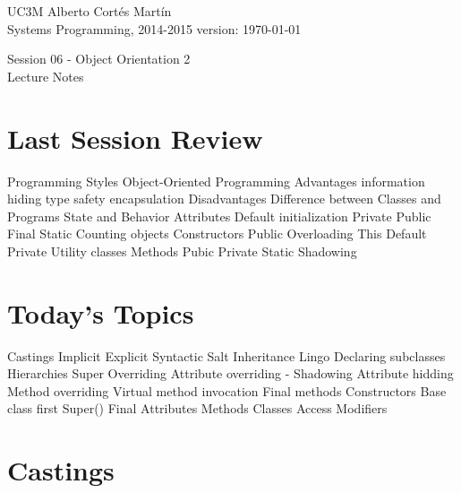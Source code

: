 \documentclass[a4paper, 9pt]{extarticle}
\newcommand{\realtitle}{Session 06 - Object Orientation 2}
\begin{document}
\makebox[\linewidth]{\rule{\textwidth}{0.4pt}}
UC3M \hfill Alberto Cortés Martín\\
Systems Programming, 2014-2015 \hfill version: \today\\
\makebox[\linewidth]{\rule{\textwidth}{0.4pt}}
\begin{center}
  \Large{\realtitle}\\Lecture Notes
\end{center}
\makebox[\linewidth]{\rule{\textwidth}{0.4pt}}
\vspace{1cm}

\section{Last Session Review}

\begin{blackboard}
Programming Styles
Object-Oriented Programming
  Advantages
    information hiding
    type safety
    encapsulation
  Disadvantages
Difference between Classes and Programs
State and Behavior
Attributes
  Default initialization
  Private
  Public
  Final
  Static
    Counting objects
Constructors
  Public
  Overloading
  This
  Default
  Private
    Utility classes
Methods
  Pubic
  Private
  Static
Shadowing
\end{blackboard}









\section{Today's Topics}
\begin{blackboard}
Castings
  Implicit
  Explicit
  Syntactic Salt
Inheritance
  Lingo
  Declaring subclasses
  Hierarchies
  Super
  Overriding
    Attribute overriding - Shadowing
      Attribute hidding
    Method overriding
      Virtual method invocation
      Final methods
  Constructors
    Base class first
    Super()
  Final
    Attributes
    Methods
    Classes
  Access Modifiers
\end{blackboard}









\section{Castings}
\end{document}
